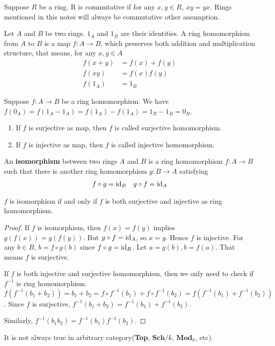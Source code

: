 \documentclass{amsart}
\begin{document}
 Suppose $R$ be a ring. R is commutative if for any $x,y \in R$, $xy=yx$. Rings mentioned in this notes will always be commutative other assumption.
\begin{secdefn}
Let $A$ and $B$ be two rings. $1_A$ and $1_B$ are their identities. A ring homomorphism from $A$ to $B$ is a map $f: A \rightarrow B$, which preserves both addition and multiplication structure, that means, for any $x,y \in A$
\[
\begin{aligned}
f(x +y) &=f(x) +f(y)\\
f(xy) &= f(x) f(y)\\
f(1_A)&=1_B
\end{aligned}
\]
\end{secdefn}
 Suppose $f: A \rightarrow B$ be a ring homomorphism. We have $f(0_A) = f(1_A - 1_A)=f(1_A) - f(1_A)= 1_B - 1_B = 0_B$.
 \begin{enumerate}
 \item If $f$ is surjective as map, then $f$ is called surjective homomorphism.
 \item If $f$ is injective as map, then $f$ is called injective homomorphism.
 \end{enumerate}
\begin{secdefn}
An \textbf{isomorphism} between two rings $A$ and $B$ is a ring homomorphism $f: A \rightarrow B$ such that there is another ring homomorphism $g:B \rightarrow A$ satisfying
\[
\begin{aligned}
f \circ g = \text{id}_{B} & & g \circ f = \text{id}_{A}
\end{aligned}
\]
\end{secdefn}
\begin{rem}
$f$ is isomorphism if and only if  $f$ is both surjective and injective as ring homomorphism.
\end{rem}
\begin{proof}
If $f$ is isomorphism, then $f(x) = f(y)$ implies $g(f(x))=g(f(y))$. But $g \circ f = \text{id}_{A}$, so $x=y$. Hence $f$ is injective. For any $b \in B$, $b= f \circ g(b)$ since $f \circ g= \text{id}_{B}$. Let $a= g(b), b=f(a)$. That means $f$ is surjective. 

If $f$ is both injective and surjective homomorphism, then we only need to check if $f^{-1}$ is ring homomorphism. $f(f^{-1}(b_1 + b_2)) = b_1 + b_2 = f \circ f^{-1} (b_1) + f \circ f^{-1}(b_2)= f(f^{-1}(b_1)+ f^{-1}(b_2))$. Since $f$ is surjective, $f^{-1}(b_1 + b_2) = f^{-1}(b_1) + f^{-1}(b_2)$.

Similarly, $f^{-1}(b_1 b_2) = f^{-1}(b_1) f^{-1}(b_2)$.
\end{proof}
It is not always true in arbitrary category(\textbf{Top}, $\textbf{Sch}/k$, $\textbf{Mod}_k$, etc).
\end{document}
